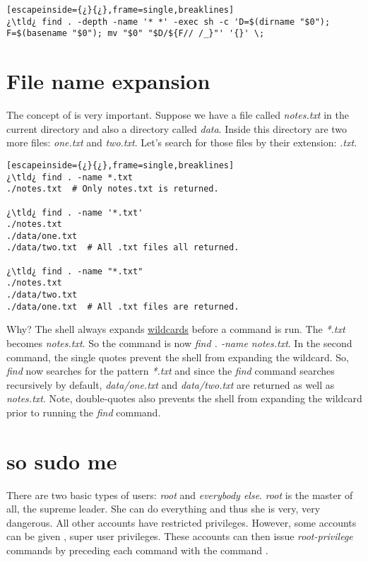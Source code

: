 
\begin{lstlisting}[escapeinside={¿}{¿},frame=single,breaklines]
¿\tld¿ find . -depth -name '* *' -exec sh -c 'D=$(dirname "$0"); F=$(basename "$0"); mv "$0" "$D/${F// /_}"' '{}' \;
\end{lstlisting}

	
\section{File name expansion}

The concept of  is very important. Suppose we have a file called \textsl{notes.txt} in the current directory and also a directory called \textsl{data}. Inside this directory are two more files: \textsl{one.txt} and \textsl{two.txt}. Let's search for those files by their extension: \textsl{.txt}.

\begin{lstlisting}[escapeinside={¿}{¿},frame=single,breaklines]
¿\tld¿ find . -name *.txt
./notes.txt  # Only notes.txt is returned.

¿\tld¿ find . -name '*.txt'
./notes.txt 
./data/one.txt
./data/two.txt	# All .txt files all returned.

¿\tld¿ find . -name "*.txt"
./notes.txt
./data/two.txt
./data/one.txt  # All .txt files are returned.
\end{lstlisting}

Why? The shell always expands \href{http://tldp.org/LDP/GNU-Linux-Tools-Summary/html/x11655.htm}{wildcards} before a command is run. The \textsl{*.txt} becomes \textsl{notes.txt}. So the command is now \emph{find . -name notes.txt}. In the second command, the single quotes prevent the shell from expanding the wildcard. So, \emph{find} now searches for the pattern \textsl{*.txt} and since the \emph{find} command searches recursively by default, \textsl{data/one.txt} and \textsl{data/two.txt} are returned as well as \textsl{notes.txt}. Note, double-quotes also prevents the shell from expanding the wildcard prior to running the \emph{find} command.

\section{so sudo me}\label{sec:sudo}

There are two basic types of users: \emph{root} and \emph{everybody else}. \emph{root} is the master of all, the supreme leader. She can do everything and thus she is very, very dangerous. All other accounts have restricted privileges. However, some accounts can be given , super user privileges. These accounts can then issue \emph{root-privilege} commands by preceding each command with the command .

